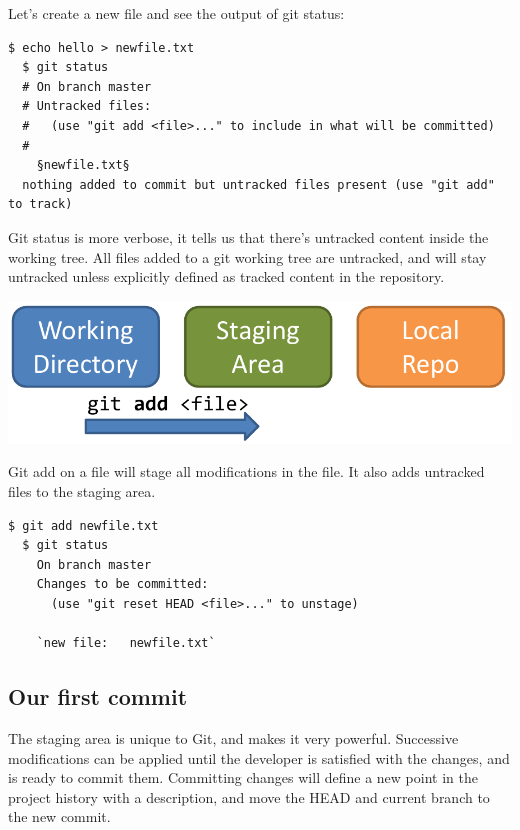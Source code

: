 \documentclass{../common/tufte-latex/tufte-handout}
\begin{document}
Let's create a new file and see the output of git status:

\begin{lstlisting}[style=BashInputStyle]
  $ echo hello > newfile.txt
  $ git status
  # On branch master
  # Untracked files:
  #   (use "git add <file>..." to include in what will be committed)
  #
    §newfile.txt§
  nothing added to commit but untracked files present (use "git add" to track)
\end{lstlisting}

Git status is more verbose, it tells us that there's untracked content inside the working tree.
All files added to a git working tree are untracked, and will stay untracked unless explicitly defined as tracked content in the repository.

\begin{marginfigure}%
  \centering
  \includegraphics[width=\linewidth]{gitadd-schema.pdf}
  \label{fig:gitadd}
  \caption{Git add on a file will stage all modifications in the file. It also adds untracked files to the staging area.}
\end{marginfigure}

\begin{lstlisting}[style=BashInputStyle]
  $ git add newfile.txt
  $ git status
    On branch master
    Changes to be committed:
      (use "git reset HEAD <file>..." to unstage)
  
    `new file:   newfile.txt`
\end{lstlisting}

\subsection{Our first commit}

The staging area is unique to Git, and makes it very powerful.
Successive modifications can be applied until the developer is satisfied with the changes, and is ready to commit them.
Committing changes will define a new point in the project history with a description, and move the HEAD and current branch to the new commit.
\end{document}
